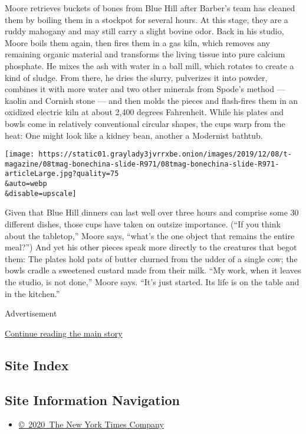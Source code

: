 Moore retrieves buckets of bones from Blue Hill after Barber's team has
cleaned them by boiling them in a stockpot for several hours. At this
stage, they are a ruddy mahogany and may still carry a slight bovine
odor. Back in his studio, Moore boils them again, then fires them in a
gas kiln, which removes any remaining organic material and transforms
the living tissue into pure calcium phosphate. He mixes the ash with
water in a ball mill, which rotates to create a kind of sludge. From
there, he dries the slurry, pulverizes it into powder, combines it with
more water and two other minerals from Spode's method --- kaolin and
Cornish stone --- and then molds the pieces and flash-fires them in an
oxidized electric kiln at about 2,400 degrees Fahrenheit. While his
plates and bowls come in relatively conventional circular shapes, the
cups warp from the heat: One might look like a kidney bean, another a
Modernist bathtub.

\texttt{[image: https://static01.graylady3jvrrxbe.onion/images/2019/12/08/t-magazine/08tmag-bonechina-slide-R971/08tmag-bonechina-slide-R971-articleLarge.jpg?quality=75\\\&auto=webp\\\&disable=upscale]}

Given that Blue Hill dinners can last well over three hours and comprise
some 30 different dishes, those cups have taken on outsize importance.
(``If you think about the tabletop,'' Moore says, ``what's the one
object that remains the entire meal?'') And yet his other pieces speak
more directly to the creatures that begot them: The plates hold pats of
butter churned from the udder of a single cow; the bowls cradle a
sweetened custard made from their milk. ``My work, when it leaves the
studio, is not done,'' Moore says. ``It's just started. Its life is on
the table and in the kitchen.''

Advertisement

\protect\hyperlink{after-bottom}{Continue reading the main story}

\hypertarget{site-index}{%
\subsection{Site Index}\label{site-index}}

\hypertarget{site-information-navigation}{%
\subsection{Site Information
Navigation}\label{site-information-navigation}}

\begin{itemize}
\tightlist
\item
  \href{https://help.nytimes3xbfgragh.onion/hc/en-us/articles/115014792127-Copyright-notice}{©~2020~The
  New York Times Company}
\end{itemize}

